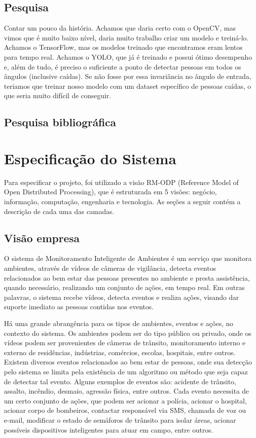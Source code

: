 \documentclass[]{politex}
\begin{document}
\section{Pesquisa}
Contar um pouco da história. Achamos que daria certo com o OpenCV, mas vimos que é muito baixo nível, daria muito trabalho criar um modelo e treiná-lo. Achamos o TensorFlow, mas os modelos treinado que encontramos eram lentos para tempo real. Achamos o YOLO, que já é treinado e possui ótimo desempenho e, além de tudo, é preciso o suficiente a ponto de detectar pessoas em todos os ângulos (inclusive caídas). Se não fosse por essa invariância no ângulo de entrada, teriamos que treinar nosso modelo com um dataset específico de pessoas caídas, o que seria muito difícil de conseguir.

\section{Pesquisa bibliográfica}


\chapter{Especificação do Sistema}
Para especificar o projeto, foi utilizado a visão RM-ODP (Reference Model of Open Distributed Processing), que é estruturada em 5 visões: negócio, informação, computação, engenharia e tecnologia. As seções a seguir contém a descrição de cada uma das camadas.

\section{Visão empresa}
O sistema de Monitoramento Inteligente de Ambientes é um serviço que monitora ambientes, através de vídeos de câmeras de vigilância, detecta eventos relacionados ao bem estar das pessoas presentes no ambiente e presta assistência, quando necessário, realizando um conjunto de ações, em tempo real. Em outras palavras, o sistema recebe vídeos, detecta eventos e realiza ações, visando dar suporte imediato as pessoas contidas nos eventos.

Há uma grande abrangência para os tipos de ambientes, eventos e ações, no contexto do sistema. Os ambientes podem ser do tipo público ou privado, onde os vídeos podem ser provenientes de câmeras de trânsito, monitoramento interno e externo de residências, indústrias, comércios, escolas, hospitais, entre outros. Existem diversos eventos relacionados ao bem estar de pessoas, onde sua detecção pelo sistema se limita pela existência de um algoritmo ou método que seja capaz de detectar tal evento. Alguns exemplos de eventos são: acidente de trânsito, assalto, incêndio, desmaio, agressão física, entre outros. Cada evento necessita de um certo conjunto de ações, que podem ser acionar a polícia, acionar o hospital, acionar corpo de bombeiros, contactar responsável via SMS, chamada de voz ou e-mail, modificar o estado de semáforos de trânsito para isolar áreas, acionar possíveis dispositivos inteligentes para atuar em campo, entre outros.
\end{document}
